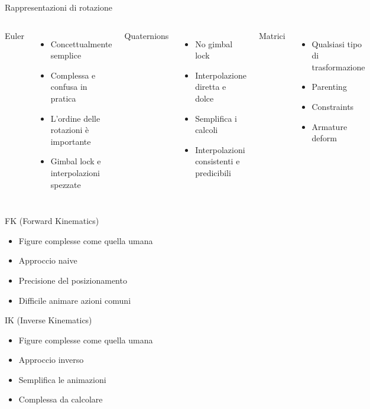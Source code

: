\documentclass[10pt]{beamer}
\begin{document}
\begin{frame}{Rappresentazioni di rotazione}
  \begin{columns}[T,onlytextwidth]
    Euler
      \begin{itemize}[<+- | alert@+>]
        \item Concettualmente semplice
        \item Complessa e confusa in pratica
        \item L'ordine delle rotazioni è importante
        \item Gimbal lock e interpolazioni spezzate
      \end{itemize}

      Quaternions
      \begin{itemize}[<+- | alert@+>]
        \item No gimbal lock
        \item Interpolazione diretta e dolce
        \item Semplifica i calcoli
        \item Interpolazioni consistenti e predicibili
      \end{itemize}
      
    Matrici
      \begin{itemize}[<+- | alert@+>]
        \item Qualsiasi tipo di trasformazione
        \item Parenting
        \item Constraints
        \item Armature deform
      \end{itemize}
  \end{columns}
\end{frame}

\begin{frame}{FK (Forward Kinematics)}
  \begin{itemize}[<+- | alert@+>]
    \item Figure complesse come quella umana
    \item Approccio naive
		\item Precisione del posizionamento
    \item Difficile animare azioni comuni
  \end{itemize}
\end{frame}

\begin{frame}{IK (Inverse Kinematics)}
  \begin{itemize}[<+- | alert@+>]
    \item Figure complesse come quella umana
    \item Approccio inverso
		\item Semplifica le animazioni
    \item Complessa da calcolare
  \end{itemize}
\end{frame}
\end{document}
